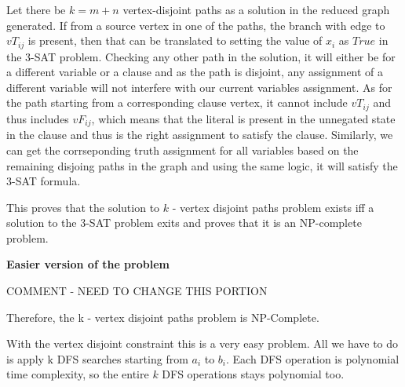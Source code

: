\documentclass{imports}
\begin{document}
    Let there be $k = m+n$ vertex-disjoint paths as a solution in the reduced graph generated. If from a source vertex in one of the paths, the branch with edge to $vT_{ij}$ is present, then that can be translated to setting the value of $x_i$ as $True$ in the 3-SAT problem. Checking any other path in the solution, it will either be for a different variable or a clause and as the path is disjoint, any assignment of a different variable will not interfere with our current variables assignment. As for the path starting from a corresponding clause vertex, it cannot include $vT_{ij}$ and thus includes $vF_{ij}$, which means that the literal is present in the unnegated state in the clause and thus is the right assignment to satisfy the clause. Similarly, we can get the corrseponding truth assignment for all variables based on the remaining disjoing paths in the graph and using the same logic, it will satisfy the 3-SAT formula. \vspace{10pt}
 
    This proves that the solution to $k$ - vertex disjoint paths problem exists iff a solution to the 3-SAT problem exits and proves that it is an NP-complete problem. \vspace{10pt}


    \textbf{Easier version of the problem}

    COMMENT -  NEED TO CHANGE THIS PORTION

    Therefore, the k - vertex disjoint paths problem is NP-Complete. 

    With the vertex disjoint constraint this is a very easy problem. All we have to do is apply k DFS searches starting from $a_i$
    to $b_i$. Each DFS operation is polynomial time complexity, so the entire $k$ DFS operations stays polynomial too.





    \vspace{10pt}
    \cite{team}
    \newpage
    
    
\end{document}

